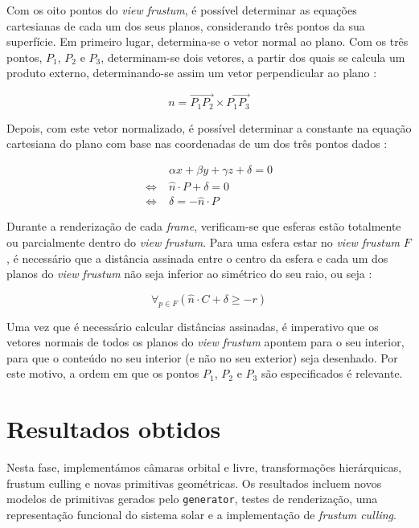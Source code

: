 \documentclass[12pt, a4paper]{article}
\begin{document}
Com os oito pontos do \emph{view frustum}, é possível determinar as equações cartesianas de cada
um dos seus planos, considerando três pontos da sua superfície. Em primeiro lugar, determina-se o
vetor normal ao plano. Com os três pontos, $P_1$, $P_2$ e $P_3$, determinam-se dois vetores, a
partir dos quais se calcula um produto externo, determinando-se assim um vetor perpendicular ao
plano \cite{lighthouse3d-plane}:

$$
n = \overrightarrow{P_1 P_2} \times \overrightarrow{P_1 P_3}
$$

Depois, com este vetor normalizado, é possível determinar a constante na equação cartesiana do plano
com base nas coordenadas de um dos três pontos dados \cite{lighthouse3d-plane}:

\begin{align*}
                       & \alpha x + \beta y + \gamma z + \delta = 0 \\
    \Leftrightarrow \; & \widehat{n} \cdot P + \delta = 0 \\
    \Leftrightarrow \; & \delta = -\widehat{n} \cdot P
\end{align*}

Durante a renderização de cada \emph{frame}, verificam-se que esferas estão totalmente ou
parcialmente dentro do \emph{view frustum}. Para uma esfera estar no \emph{view frustum} $F$, é
necessário que a distância assinada entre o centro da esfera e cada um dos planos do
\emph{view frustum} não seja inferior ao simétrico do seu raio, ou seja \cite{lighthouse3d-sphere}:

$$
\forall_{p \in F} \left ( \widehat{n} \cdot C + \delta \ge - r \right )
$$

Uma vez que é necessário calcular distâncias assinadas, é imperativo que os vetores normais de todos
os planos do \emph{view frustum} apontem para o seu interior, para que o conteúdo no seu interior (e
não no seu exterior) seja desenhado. \cite{lighthouse3d-frustum-planes} Por este motivo, a ordem em
que os pontos $P_1$, $P_2$ e $P_3$ são especificados é relevante.

\section{Resultados obtidos}

Nesta fase, implementámos câmaras orbital e livre, transformações hierárquicas, frustum culling e
novas primitivas geométricas. Os resultados incluem novos modelos de primitivas gerados pelo
\texttt{generator}, testes de renderização, uma representação funcional do sistema solar e a
implementação de \textit{frustum culling}.
\end{document}
